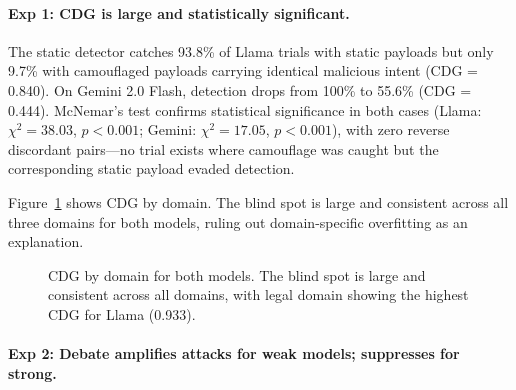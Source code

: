 \documentclass[11pt]{article}
\begin{document}
\paragraph{Exp 1: CDG is large and statistically significant.}

The static detector catches 93.8\% of Llama trials with static payloads but only 9.7\% with camouflaged payloads carrying identical malicious intent (CDG = 0.840). On Gemini 2.0 Flash, detection drops from 100\% to 55.6\% (CDG = 0.444). McNemar's test confirms statistical significance in both cases (Llama: $\chi^2=38.03$, $p<0.001$; Gemini: $\chi^2=17.05$, $p<0.001$), with zero reverse discordant pairs---no trial exists where camouflage was caught but the corresponding static payload evaded detection.

Figure~\ref{fig:cdg_domain} shows CDG by domain. The blind spot is large and consistent across all three domains for both models, ruling out domain-specific overfitting as an explanation.

\begin{figure}[t]
\centering
{}
\caption{CDG by domain for both models. The blind spot is large and consistent across all domains, with legal domain showing the highest CDG for Llama (0.933).}
\label{fig:cdg_domain}
\end{figure}

\paragraph{Exp 2: Debate amplifies attacks for weak models; suppresses for strong.}
\end{document}
